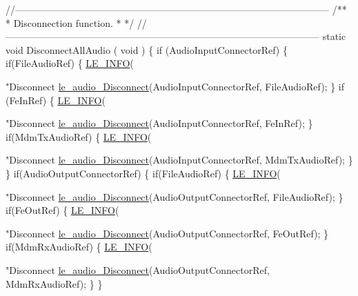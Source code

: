 \begin{DoxyCodeInclude}
{{{{{{{{{{{\textcolor{comment}{//--------------------------------------------------------------------------------------------------}\textcolor{comment}{}
\textcolor{comment}{/**}
\textcolor{comment}{ * Disconnection function.}
\textcolor{comment}{ *}
\textcolor{comment}{ */}
\textcolor{comment}{//--------------------------------------------------------------------------------------------------}
\textcolor{keyword}{static} \textcolor{keywordtype}{void} DisconnectAllAudio
(
    \textcolor{keywordtype}{void}
)
\{
    \textcolor{keywordflow}{if} (AudioInputConnectorRef)
    \{
        \textcolor{keywordflow}{if}(FileAudioRef)
        \{
            \hyperlink{le__log_8h_a23e6d206faa64f612045d688cdde5808}{LE\_INFO}(\textcolor{stringliteral}{"Disconnect %
            \hyperlink{le__audio__interface_8h_a6b88df9301038375701e4c15a4c8aaf0}{le\_audio\_Disconnect}(AudioInputConnectorRef, FileAudioRef);
        \}
        \textcolor{keywordflow}{if} (FeInRef)
        \{
            \hyperlink{le__log_8h_a23e6d206faa64f612045d688cdde5808}{LE\_INFO}(\textcolor{stringliteral}{"Disconnect %
            \hyperlink{le__audio__interface_8h_a6b88df9301038375701e4c15a4c8aaf0}{le\_audio\_Disconnect}(AudioInputConnectorRef, FeInRef);
        \}
        \textcolor{keywordflow}{if}(MdmTxAudioRef)
        \{
            \hyperlink{le__log_8h_a23e6d206faa64f612045d688cdde5808}{LE\_INFO}(\textcolor{stringliteral}{"Disconnect %
            \hyperlink{le__audio__interface_8h_a6b88df9301038375701e4c15a4c8aaf0}{le\_audio\_Disconnect}(AudioInputConnectorRef, MdmTxAudioRef);
        \}
    \}
    \textcolor{keywordflow}{if}(AudioOutputConnectorRef)
    \{
        \textcolor{keywordflow}{if}(FileAudioRef)
        \{
            \hyperlink{le__log_8h_a23e6d206faa64f612045d688cdde5808}{LE\_INFO}(\textcolor{stringliteral}{"Disconnect %
            \hyperlink{le__audio__interface_8h_a6b88df9301038375701e4c15a4c8aaf0}{le\_audio\_Disconnect}(AudioOutputConnectorRef, FileAudioRef);
        \}
        \textcolor{keywordflow}{if}(FeOutRef)
        \{
            \hyperlink{le__log_8h_a23e6d206faa64f612045d688cdde5808}{LE\_INFO}(\textcolor{stringliteral}{"Disconnect %
            \hyperlink{le__audio__interface_8h_a6b88df9301038375701e4c15a4c8aaf0}{le\_audio\_Disconnect}(AudioOutputConnectorRef, FeOutRef);
        \}
        \textcolor{keywordflow}{if}(MdmRxAudioRef)
        \{
            \hyperlink{le__log_8h_a23e6d206faa64f612045d688cdde5808}{LE\_INFO}(\textcolor{stringliteral}{"Disconnect %
            \hyperlink{le__audio__interface_8h_a6b88df9301038375701e4c15a4c8aaf0}{le\_audio\_Disconnect}(AudioOutputConnectorRef, MdmRxAudioRef);
        \}
    \}

}}}}}}}}}}}}}}}}}
\end{DoxyCodeInclude}
